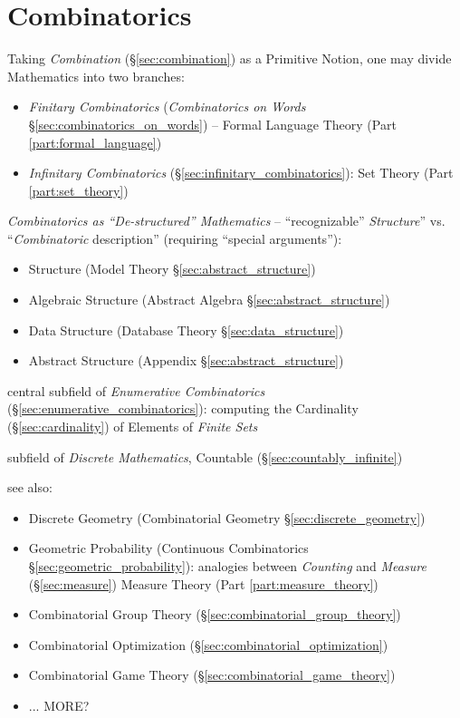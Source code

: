 \part{Combinatorics}\label{part:combinatorics}

Taking \emph{Combination} (\S\ref{sec:combination}) as a Primitive Notion, one
may divide Mathematics into two branches:
\begin{itemize}
  \item \emph{Finitary Combinatorics} (\emph{Combinatorics on Words}
    \S\ref{sec:combinatorics_on_words}) -- Formal Language Theory (Part
    \ref{part:formal_language})
  \item \emph{Infinitary Combinatorics} (\S\ref{sec:infinitary_combinatorics}):
    Set Theory (Part \ref{part:set_theory})
\end{itemize}

\emph{Combinatorics as ``De-structured'' Mathematics} -- ``recognizable''
\emph{Structure}'' vs. ``\emph{Combinatoric} description'' (requiring ``special
arguments''):
\begin{itemize}
  \item Structure (Model Theory \S\ref{sec:abstract_structure})
  \item Algebraic Structure (Abstract Algebra \S\ref{sec:abstract_structure})
  \item Data Structure (Database Theory \S\ref{sec:data_structure})
  \item Abstract Structure (Appendix \S\ref{sec:abstract_structure})
\end{itemize}

central subfield of \emph{Enumerative Combinatorics}
(\S\ref{sec:enumerative_combinatorics}): computing the Cardinality
(\S\ref{sec:cardinality}) of Elements of \emph{Finite Sets}

subfield of \emph{Discrete Mathematics}, Countable
(\S\ref{sec:countably_infinite})

see also:
\begin{itemize}
  \item Discrete Geometry (Combinatorial Geometry \S\ref{sec:discrete_geometry})
  \item Geometric Probability (Continuous Combinatorics
    \S\ref{sec:geometric_probability}): analogies between \emph{Counting} and
    \emph{Measure} (\S\ref{sec:measure}) \fist Measure Theory (Part
    \ref{part:measure_theory})
  \item Combinatorial Group Theory (\S\ref{sec:combinatorial_group_theory})
  \item Combinatorial Optimization (\S\ref{sec:combinatorial_optimization})
  \item Combinatorial Game Theory (\S\ref{sec:combinatorial_game_theory})
  \item ... MORE?
\end{itemize}

